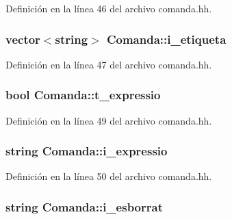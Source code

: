 Definición en la línea 46 del archivo comanda.\-hh.

\hypertarget{class_comanda_a1d193f66ea6d2681ab79a16192da3114}{
\subsubsection[{i\-\_\-etiqueta}]{\setlength{\rightskip}{0pt plus 5cm}vector$<$string$>$ Comanda\-::i\-\_\-etiqueta\hspace{0.3cm}{\ttfamily [private]}}}\label{class_comanda_a1d193f66ea6d2681ab79a16192da3114}


Definición en la línea 47 del archivo comanda.\-hh.

\hypertarget{class_comanda_ac7037525fc1cd9f49b02bd87cf4b6123}{
\subsubsection[{t\-\_\-expressio}]{\setlength{\rightskip}{0pt plus 5cm}bool Comanda\-::t\-\_\-expressio\hspace{0.3cm}{\ttfamily [private]}}}\label{class_comanda_ac7037525fc1cd9f49b02bd87cf4b6123}


Definición en la línea 49 del archivo comanda.\-hh.

\hypertarget{class_comanda_a9236cdc5142b6a9f4116673abce06508}{
\subsubsection[{i\-\_\-expressio}]{\setlength{\rightskip}{0pt plus 5cm}string Comanda\-::i\-\_\-expressio\hspace{0.3cm}{\ttfamily [private]}}}\label{class_comanda_a9236cdc5142b6a9f4116673abce06508}


Definición en la línea 50 del archivo comanda.\-hh.

\hypertarget{class_comanda_a269a43d5b283a23792791a2ba67747b0}{
\subsubsection[{i\-\_\-esborrat}]{\setlength{\rightskip}{0pt plus 5cm}string Comanda\-::i\-\_\-esborrat\hspace{0.3cm}{\ttfamily [private]}}}\label{class_comanda_a269a43d5b283a23792791a2ba67747b0}


